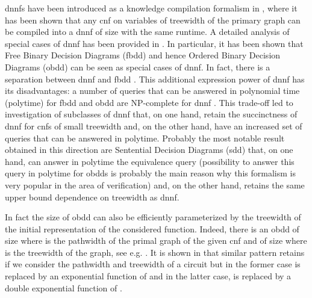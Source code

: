 \documentclass{llncs}
\begin{document}
{\sc dnnf}s have been introduced as a knowledge compilation formalism in \cite{DarwicheJACM}, where it has been shown
that any {\sc cnf} on  variables of treewidth  of the primary graph can be compiled into a {\sc dnnf} of size 
with the same runtime. A detailed analysis of special cases of {\sc dnnf} has been provided in \cite{DerMar}. In particular,
it has been shown that Free Binary Decision Diagrams ({\sc fbdd}) and hence Ordered Binary Decision Diagrams ({\sc obdd}) can be seen as special cases of {\sc dnnf}. 
In fact, there is a separation between {\sc dnnf} and {\sc fbdd} \cite{SepDNNFFBDD}. This additional expression power of {\sc dnnf} has 
its disadvantages: a number of queries that can be answered 
in polynomial time (polytime) for {\sc fbdd} and {\sc obdd} are NP-complete for {\sc dnnf} \cite{DerMar}. This trade-off led to investigation of subclasses
of {\sc dnnf} that, on one hand, retain the succinctness of {\sc dnnf} for {\sc cnf}s of small treewidth and, on the other hand, have an increased
set of queries that can be answered in polytime. Probably the most notable result obtained in this direction are
Sentential Decision Diagrams ({\sc sdd}) \cite{SDD} that, on one hand, can answer in polytime the equivalence query
(possibility to answer this query in polytime for {\sc obdd}s is probably the main reason why this formalism is very
popular in the area of verification) and, on the other hand, retains the same upper bound dependence on treewidth
as {\sc dnnf}. 

In fact the size of {\sc obdd} can also be efficiently parameterized by the treewidth of the initial representation of the considered function. 
Indeed, there is an {\sc obdd} of size  where  is the pathwidth of the primal graph of the given
{\sc cnf} and of size  where  is the treewidth of the graph, see e.g. \cite{VardiTWD}.
It is shown in \cite{OBDDTWJha} that similar pattern retains if we consider the pathwidth and treewidth of a circuit but in the former
case  is replaced by an exponential function of  and in the latter case,  is replaced by a double exponential function
of . 
   
\end{document}
